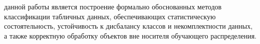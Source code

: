 


{\aim} данной работы является построение формально обоснованных методов классификации табличных данных, обеспечивающих статистическую состоятельность, устойчивость к дисбалансу классов и некомплектности данных, а также корректную обработку объектов вне носителя обучающего распределения.

